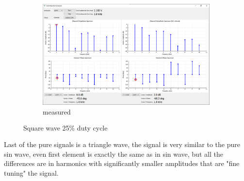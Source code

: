 \documentclass[notitlepage, a4paper, 11pt]{article}
\begin{document}
\begin{figure}[H]
\begin{subfigure}[][][t]{0.3\textwidth}
			\includegraphics[width=\textwidth, trim=10 80 555 100, clip]{../img/Circuit1/dut25}
			\caption{measured}
			\label{fig:meas-signal-c}
		\end{subfigure}
		\caption{Square wave 25\% duty cycle}
		\label{fig:pure-sin}
	\end{figure}
	
	Last of the pure signals is a triangle wave, the signal is very similar to the pure sin wave, even first element is exactly the same as in sin wave, but all the differences are in harmonics with significantly smaller amplitudes that are "fine tuning" the signal.
	
\end{document}
